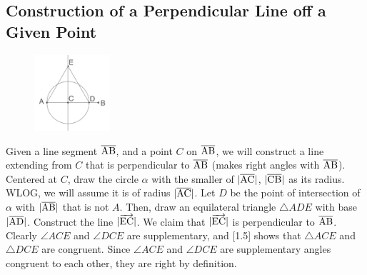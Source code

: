 \documentclass{report}
\begin{document}
\subsection{Construction of a Perpendicular Line off a Given Point}
\begin{figure} %
    \centering
    \includegraphics[width=0.25\textwidth]{perp}
\end{figure}
Given a line segment $\overline{\rm AB}$, and a point $C$ on $\overline{\rm AB}$, we will construct a line extending from $C$ that is perpendicular to $\overline{\rm AB}$ (makes right angles with $\overline{\rm AB}$).
\\[\baselineskip]
Centered at $C$, draw the circle $\alpha$ with the smaller of $|\overline{\rm AC}|$, $|\overline{\rm CB}|$ as its radius. WLOG, we will assume it is of radius $|\overline{\rm AC}|$. Let $D$ be the point of intersection of $\alpha$ with $|\overline{\rm AB}|$ that is not $A$. Then, draw an equilateral triangle $\triangle{ADE}$ with base $|\overline{\rm AD}|$. Construct the line $|\overrightarrow{\rm EC}|$. We claim that $|\overrightarrow{\rm EC}|$ is perpendicular to $\overline{\rm AB}$.
\\Clearly $\angle ACE$ and $\angle DCE$ are supplementary, and [1.5] shows that $\triangle{ACE}$ and $\triangle{DCE}$ are congruent. Since $\angle ACE$ and $\angle DCE$ are supplementary angles congruent to each other, they are right by definition.
\\[\baselineskip]
\end{document}
